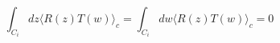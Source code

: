 \begin{equation} 
\int_{C_i}dz\langle R(z) T(w) \rangle_c =\int_{C_i}dw
\langle R(z) T(w) \rangle_c =0
\label{contour}
\end{equation}

